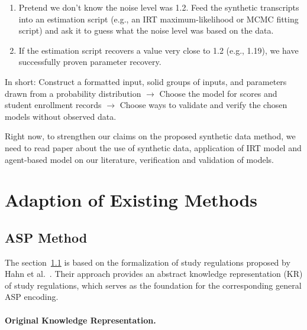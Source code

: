 \documentclass[10pt,a4paper]{article}
\begin{document}
\begin{enumerate}
\begin{enumerate}
\begin{itemize}
\begin{enumerate}
                \item Pretend we don't know the noise level was 1.2. Feed the synthetic transcripts into an estimation script (e.g., an IRT maximum-likelihood or MCMC fitting script) and ask it to guess what the noise level was based on the data.

                \item If the estimation script recovers a value very close to 1.2 (e.g., 1.19), we have successfully proven parameter recovery.
            \end{enumerate}
        \end{itemize}
    \end{enumerate}


\end{enumerate}

In short: Construct a formatted input, solid groups of inputs, and parameters drawn from a probability distribution $\rightarrow$ Choose the model for scores and student enrollment records  $\rightarrow$ Choose ways to validate and verify the chosen models without observed data.

Right now, to strengthen our claims on the proposed synthetic data method, we need to read paper about the use of synthetic data, application of IRT model and agent-based model on our literature, verification and validation of models.

\section{Adaption of Existing Methods}

    \subsection{ASP Method} \label{subsec:asp}
    
The section~\ref{subsec:asp} is based on the formalization of study regulations proposed by Hahn et al.~\cite{hahn2024reasoning}. Their approach provides an abstract knowledge representation (KR) of study regulations, which serves as the foundation for the corresponding general ASP encoding.


\paragraph{Original Knowledge Representation.}
\end{document}
